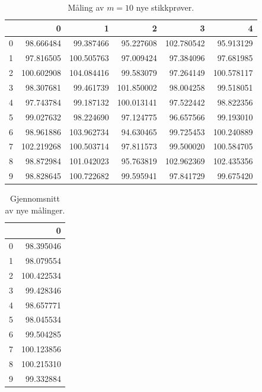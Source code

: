 \documentclass[12pt]{article}
\begin{document}
\begin{table}[H]
    \centering
    \caption{Måling av $m=10$ nye stikkprøver.}
   \begin{tabular}{lrrrrr}
\toprule
{} &           0 &           1 &           2 &           3 &           4 \\
\midrule
0 &   98.666484 &   99.387466 &   95.227608 &  102.780542 &   95.913129 \\
1 &   97.816505 &  100.505763 &   97.009424 &   97.384096 &   97.681985 \\
2 &  100.602908 &  104.084416 &   99.583079 &   97.264149 &  100.578117 \\
3 &   98.307681 &   99.461739 &  101.850002 &   98.004258 &   99.518051 \\
4 &   97.743784 &   99.187132 &  100.013141 &   97.522442 &   98.822356 \\
5 &   99.027632 &   98.224690 &   97.124775 &   96.657566 &   99.193010 \\
6 &   98.961886 &  103.962734 &   94.630465 &   99.725453 &  100.240889 \\
7 &  102.219268 &  100.503714 &   97.811573 &   99.500020 &  100.584705 \\
8 &   98.872984 &  101.042023 &   95.763819 &  102.962369 &  102.435356 \\
9 &   98.828645 &  100.722682 &   99.595941 &   97.841729 &   99.675420 \\
\bottomrule
\end{tabular}
    \label{tab:tabell6}
\end{table}

\begin{table}[H]
    \centering
    \caption{Gjennomsnitt av nye målinger.}
\begin{tabular}{lr}

\toprule
{} &           0 \\
\midrule
0 &   98.395046 \\
1 &   98.079554 \\
2 &  100.422534 \\
3 &   99.428346 \\
4 &   98.657771 \\
5 &   98.045534 \\
6 &   99.504285 \\
7 &  100.123856 \\
8 &  100.215310 \\
9 &   99.332884 \\
\bottomrule
\end{tabular}
\label{tab:tab7}
\end{table}
\end{document}
